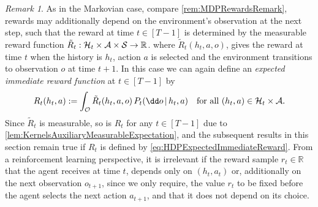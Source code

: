 \documentclass[
    a4paper,
    11pt,
    bibliography=totoc,
    listof=totoc,      
    headinclude=true,
    cleardoublepage=empty,
]{scrbook}
\theoremstyle{plain}
\theoremstyle{definition}
\theoremstyle{remark}
\newtheorem{remark}[theorem]{Remark}
\newcommand{\SetR}{\mathbb R}
\newcommand{\SpaceS}{{\cal S}}
\newcommand{\SpaceA}{{\cal A}}
\newcommand{\SpaceO}{{\cal O}}
\newcommand{\SpaceH}{{\cal H}}
\begin{document}
\begin{remark}
\label{rem:HDPRewardsRemark}
    As in the Markovian case, compare \cref{rem:MDPRewardsRemark}, rewards may
    additionally depend on the environment's observation at the next step, 
    such that the reward at time $t\in[T-1]$ is determined by the measurable 
    reward function $\tilde R_t:\SpaceH_t\times\SpaceA\times\SpaceS\to\SetR$.
    where $\tilde R_t(h_t,a,o)$, gives the reward at time $t$ when the history 
    is $h_t$, action $a$ is selected and the environment transitions to 
    observation $o$ at time $t+1$. In this case we can again define an
    \textit{expected immediate reward function} at $t\in[T-1]$ by
    \begin{equation}
    \label{eq:HDPExpectedImmediateReward}
        R_t(h_t,a) := \int_\SpaceO \tilde R_t(h_t,a,o)\, P_t(\dd o\,|\,h_t,a)
        \quad \text{for all } (h_t,a)\in\SpaceH_t\times\SpaceA.
    \end{equation}
    Since $\tilde R_t$ is measurable, so is $R_t$ for any $t\in[T-1]$ 
    due to \cref{lem:KernelsAuxiliaryMeasurableExpectation}, and the 
    subsequent results in this section remain true if $R_t$ is defined by 
    \eqref{eq:HDPExpectedImmediateReward}. From a reinforcement learning 
    perspective, it is irrelevant if the reward sample $r_t\in\SetR$ that the 
    agent receives at time $t$, depends only on $(h_t,a_t)$ or, additionally 
    on the next observation $o_{t+1}$, since we only require, the value $r_t$
    to be fixed before the agent selects the next action $a_{t+1}$, and that 
    it does not depend on its choice.    
\end{remark}
\end{document}
